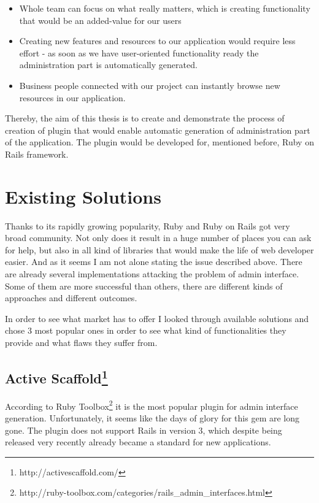   \begin{itemize}
	  \item Whole team can focus on what really matters, which is creating functionality that would be an added-value for our users
	  \item Creating new features and resources to our application would require less effort - as soon as we have user-oriented functionality ready the administration part is automatically generated.
	  \item Business people connected with our project can instantly browse new resources in our application.
	\end{itemize}
  
  Thereby, the aim of this thesis is to create and demonstrate the process of creation of plugin that would enable automatic generation of administration part of the application. The plugin would be developed for, mentioned before, Ruby on Rails framework.
  
  \section{Existing Solutions}
  Thanks to its rapidly growing popularity, Ruby and Ruby on Rails got very broad community. Not only does it result in a huge number of places you can ask for help, but also in all kind of libraries that would make the life of web developer easier. And as it seems I am not alone stating the issue described above. There are already several implementations attacking the problem of admin interface. Some of them are more successful than others, there are different kinds of approaches and different outcomes. 
  
  In order to see what market has to offer I looked through available solutions and chose 3 most popular ones in order to see what kind of functionalities they provide and what flaws they suffer from. 
  
    \subsection[Active Scaffold] {Active Scaffold\footnote{http://activescaffold.com/}}
      According to Ruby Toolbox\footnote{http://ruby-toolbox.com/categories/rails\_admin\_interfaces.html} it is the most popular plugin for admin interface generation. Unfortunately, it seems like the days of glory for this gem are long gone. The plugin does not support Rails in version 3, which despite being released very recently already became a standard for new applications. 
      
